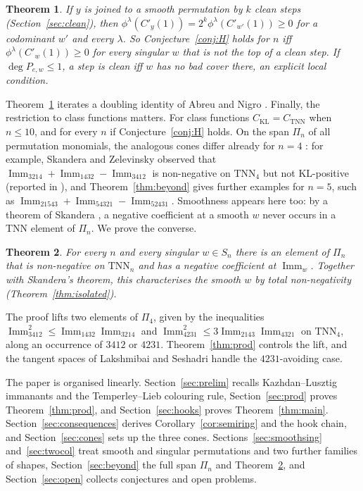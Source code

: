 \documentclass[11pt]{amsart}
\newtheorem{theorem}{Theorem}[section]
\theoremstyle{definition}
\theoremstyle{remark}
\newcommand{\Imm}{\operatorname{Imm}}
\newcommand{\TNN}{\mathrm{TNN}}
\newcommand{\CKL}{C_{\mathrm{KL}}}
\newcommand{\CTNN}{C_{\mathrm{TNN}}}
\newcommand{\Cp}[1]{C'_{#1}(1)}
\begin{document}
\begin{theorem}\label{thm:smoothclean}
If $y$ is joined to a smooth permutation by $k$ \emph{clean steps} (Section~\ref{sec:clean}), then $\phi^\lambda(\Cp y)=2^k\phi^\lambda(\Cp{w'})\ge0$ for a codominant $w'$ and every $\lambda$. So Conjecture~\ref{conj:H} holds for $n$ iff $\phi^\lambda(\Cp w)\ge0$ for every singular $w$ that is not the top of a clean step. If $\deg P_{e,w}\le1$, a step is clean iff $w$ has no \emph{bad cover} there, an explicit local condition.
\end{theorem}

Theorem~\ref{thm:smoothclean} iterates a doubling identity of Abreu and Nigro \cite{AN}. Finally, the restriction to class functions matters. For class functions $\CKL=\CTNN$ when $n\le10$, and for every $n$ if Conjecture~\ref{conj:H} holds. On the span $\Pi_n$ of all permutation monomials, the analogous cones differ already for $n=4$ \cite[\S7]{RS06}: for example, Skandera and Zelevinsky observed that $\Imm_{3214}+\Imm_{1432}-\Imm_{3412}$ is non-negative on $\TNN_4$ but not KL-positive (reported in \cite[(5.1)]{Ska08}), and Theorem~\ref{thm:beyond} gives further examples for $n=5$, such as $\Imm_{21543}+\Imm_{54321}-\Imm_{52431}$. Smoothness appears here too: by a theorem of Skandera \cite[Thm.~5.5]{Ska08}, a negative coefficient at a smooth $w$ never occurs in a TNN element of $\Pi_n$. We prove the converse.

\begin{theorem}\label{thm:isolatedintro}
For every $n$ and every singular $w\in S_n$ there is an element of $\Pi_n$ that is non-negative on $\TNN_n$ and has a negative coefficient at $\Imm_w$. Together with Skandera's theorem, this characterises the smooth $w$ by total non-negativity (Theorem~\ref{thm:isolated}).
\end{theorem}

The proof lifts two elements of $\Pi_4$, given by the inequalities $\Imm_{3412}^2\le\Imm_{1432}\Imm_{3214}$ and $\Imm_{4231}^2\le3\Imm_{2143}\Imm_{4321}$ on $\TNN_4$, along an occurrence of $3412$ or $4231$. Theorem~\ref{thm:prod} controls the lift, and the tangent spaces of Lakshmibai and Seshadri handle the $4231$-avoiding case.

The paper is organised linearly. Section~\ref{sec:prelim} recalls Kazhdan--Lusztig immanants and the Temperley--Lieb colouring rule, Section~\ref{sec:prod} proves Theorem~\ref{thm:prod}, and Section~\ref{sec:hooks} proves Theorem~\ref{thm:main}. Section~\ref{sec:consequences} derives Corollary~\ref{cor:semiring} and the hook chain, and Section~\ref{sec:cones} sets up the three cones. Sections~\ref{sec:smoothsing} and~\ref{sec:twocol} treat smooth and singular permutations and two further families of shapes, Section~\ref{sec:beyond} the full span $\Pi_n$ and Theorem~\ref{thm:isolatedintro}, and Section~\ref{sec:open} collects conjectures and open problems.
\end{document}
